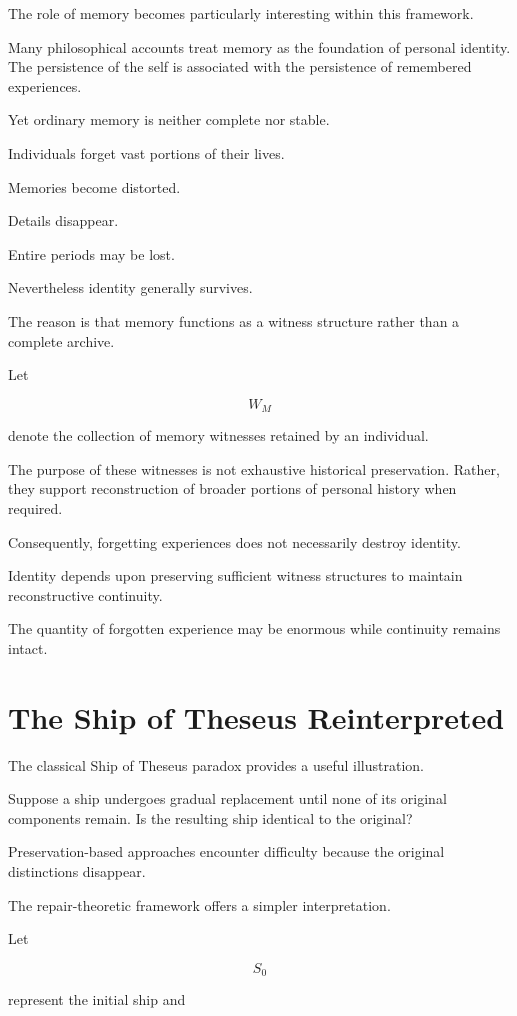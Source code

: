 \documentclass[12pt,oneside]{book}
\theoremstyle{plain} \newtheorem{theorem}{Theorem}[chapter] \newtheorem{lemma}[theorem]{Lemma} \newtheorem{proposition}[theorem]{Proposition} \newtheorem{corollary}[theorem]{Corollary}
\theoremstyle{definition} \newtheorem{definition}[theorem]{Definition} \newtheorem{axiom}[theorem]{Axiom} \newtheorem{construction}[theorem]{Construction}
\theoremstyle{remark} \newtheorem{remark}[theorem]{Remark} \newtheorem{example}[theorem]{Example}
\begin{document}
The role of memory becomes particularly interesting within this framework.

Many philosophical accounts treat memory as the foundation of personal identity. The persistence of the self is associated with the persistence of remembered experiences.

Yet ordinary memory is neither complete nor stable.

Individuals forget vast portions of their lives.

Memories become distorted.

Details disappear.

Entire periods may be lost.

Nevertheless identity generally survives.

The reason is that memory functions as a witness structure rather than a complete archive.

Let

\[
W_M
\]

denote the collection of memory witnesses retained by an individual.

The purpose of these witnesses is not exhaustive historical preservation. Rather, they support reconstruction of broader portions of personal history when required.

Consequently, forgetting experiences does not necessarily destroy identity.

Identity depends upon preserving sufficient witness structures to maintain reconstructive continuity.

The quantity of forgotten experience may be enormous while continuity remains intact.

\section{The Ship of Theseus Reinterpreted}

The classical Ship of Theseus paradox provides a useful illustration.

Suppose a ship undergoes gradual replacement until none of its original components remain. Is the resulting ship identical to the original?

Preservation-based approaches encounter difficulty because the original distinctions disappear.

The repair-theoretic framework offers a simpler interpretation.

Let

\[
S_0
\]

represent the initial ship and
\end{document}

